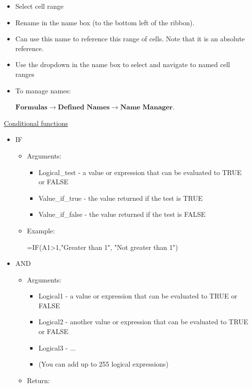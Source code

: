 \documentclass[8pt]{extarticle}
\begin{document}
\begin{multicols}{3}
\begin{itemize}
    \item Select cell range
    \item Rename in the name box (to the bottom left of the ribbon).
    \item Can use this name to reference this range of cells. Note that it is an absolute reference.
    \item Use the dropdown in the name box to select and navigate to named cell ranges
    \item To manage names: 
    
    $\textbf{Formulas} \rightarrow \textbf{Defined Names} \rightarrow \textbf{Name Manager}$.
\end{itemize}

\columnbreak
\begin{center}
    \underline{Conditional functions}
\end{center}

\begin{itemize}
    \item IF
    \begin{itemize}
        \item Arguments:
        \begin{itemize}
            \item Logical\_test - a value or expression that can be evaluated to TRUE or FALSE
            \item Value\_if\_true - the value returned if the test is TRUE
            \item Value\_if\_false - the value returned if the test is FALSE
        \end{itemize}
    \item Example: 
    
    =IF(A1>1,"Greater than 1", "Not greater than 1")
    \end{itemize}
\end{itemize}

\begin{itemize}
    \item AND
    \begin{itemize}
        \item Arguments:
        \begin{itemize}
            \item Logical1 - a value or expression that can be evaluated to TRUE or FALSE
            \item Logical2 - another value or expression that can be evaluated to TRUE or FALSE
            \item Logical3 - ...
            \item (You can add up to 255 logical expressions)
        \end{itemize}
        \item Return:


\end{itemize}
\end{itemize}
\end{multicols}
\end{document}
